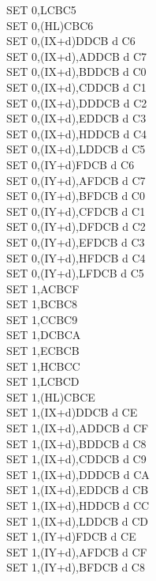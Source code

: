 \begin{multicols}{3}
{\begin{tabbing}
		SET 0,L\>CBC5\\
		SET 0,(HL)\>CBC6\\
		SET 0,(IX+d)\>DDCB d C6\\
		SET 0,(IX+d),A\UNDOC\>DDCB d C7\\
		SET 0,(IX+d),B\UNDOC\>DDCB d C0\\
		SET 0,(IX+d),C\UNDOC\>DDCB d C1\\
		SET 0,(IX+d),D\UNDOC\>DDCB d C2\\
		SET 0,(IX+d),E\UNDOC\>DDCB d C3\\
		SET 0,(IX+d),H\UNDOC\>DDCB d C4\\
		SET 0,(IX+d),L\UNDOC\>DDCB d C5\\
		SET 0,(IY+d)\>FDCB d C6\\
		SET 0,(IY+d),A\UNDOC\>FDCB d C7\\
		SET 0,(IY+d),B\UNDOC\>FDCB d C0\\
		SET 0,(IY+d),C\UNDOC\>FDCB d C1\\
		SET 0,(IY+d),D\UNDOC\>FDCB d C2\\
		SET 0,(IY+d),E\UNDOC\>FDCB d C3\\
		SET 0,(IY+d),H\UNDOC\>FDCB d C4\\
		SET 0,(IY+d),L\UNDOC\>FDCB d C5\\
		SET 1,A\>CBCF\\
		SET 1,B\>CBC8\\
		SET 1,C\>CBC9\\
		SET 1,D\>CBCA\\
		SET 1,E\>CBCB\\
		SET 1,H\>CBCC\\
		SET 1,L\>CBCD\\
		SET 1,(HL)\>CBCE\\
		SET 1,(IX+d)\>DDCB d CE\\
		SET 1,(IX+d),A\UNDOC\>DDCB d CF\\
		SET 1,(IX+d),B\UNDOC\>DDCB d C8\\
		SET 1,(IX+d),C\UNDOC\>DDCB d C9\\
		SET 1,(IX+d),D\UNDOC\>DDCB d CA\\
		SET 1,(IX+d),E\UNDOC\>DDCB d CB\\
		SET 1,(IX+d),H\UNDOC\>DDCB d CC\\
		SET 1,(IX+d),L\UNDOC\>DDCB d CD\\
		SET 1,(IY+d)\>FDCB d CE\\
		SET 1,(IY+d),A\UNDOC\>FDCB d CF\\
		SET 1,(IY+d),B\UNDOC\>FDCB d C8\\

\end{tabbing}}
\end{multicols}
